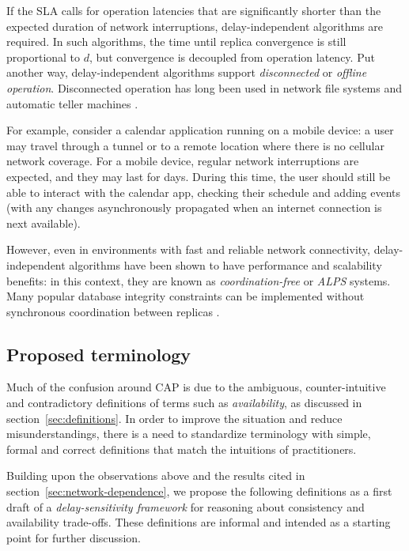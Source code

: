\documentclass[fleqn,12pt,lineno]{wlpeerj} %
\begin{document}
If the SLA calls for operation latencies that are significantly shorter than the expected duration
of network interruptions, delay-independent algorithms are required. In such algorithms, the time
until replica convergence is still proportional to $d$, but convergence is decoupled from operation
latency. Put another way, delay-independent algorithms support \emph{disconnected} or \emph{offline
operation}. Disconnected operation has long been used in network file systems \citep{Kistler1992bt}
and automatic teller machines \citep{Brewer2012tr}.

For example, consider a calendar application running on a mobile device: a user may travel through a
tunnel or to a remote location where there is no cellular network coverage. For a mobile device,
regular network interruptions are expected, and they may last for days. During this time, the user
should still be able to interact with the calendar app, checking their schedule and adding events
(with any changes asynchronously propagated when an internet connection is next available).

However, even in environments with fast and reliable network connectivity, delay-independent
algorithms have been shown to have performance and scalability benefits: in this context, they are
known as \emph{coordination-free} \citep{Bailis2014th} or \emph{ALPS} \citep{Lloyd2011hz} systems.
Many popular database integrity constraints can be implemented without synchronous coordination
between replicas \citep{Bailis2014th}.

\subsection{Proposed terminology}\label{sec:terminology}

Much of the confusion around CAP is due to the ambiguous, counter-intuitive and contradictory
definitions of terms such as \emph{availability}, as discussed in section~\ref{sec:definitions}. In
order to improve the situation and reduce misunderstandings, there is a need to standardize
terminology with simple, formal and correct definitions that match the intuitions of practitioners.

Building upon the observations above and the results cited in section~\ref{sec:network-dependence},
we propose the following definitions as a first draft of a \emph{delay-sensitivity framework} for
reasoning about consistency and availability trade-offs. These definitions are informal and intended
as a starting point for further discussion.
\end{document}
